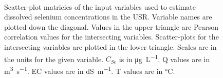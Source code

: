 \begin{landscape}
\begin{figure}
\begin{subfigure}{0.7\textwidth}
		\end{subfigure}\\
		\caption[Scatter-plot matricies of the input variables used to estimate dissolved selenium concentrations in the USR.]{Scatter-plot matricies of the input variables used to estimate dissolved selenium concentrations in the USR.  Variable names are plotted down the diagonal.  Values in the upper triangle are Pearson correlation values for the intersecting variables.  Scatter-plots for the intersecting variables are plotted in the lower triangle.  Scales are in the units for the given variable.  $C_{Se}$ is in \si{\micro\gram\per\liter}.  Q values are in \si{\cubic\meter\per\second}.  EC values are in \si{\deci\siemens\per\meter}.  T values are in \si{\degreeCelsius}.}
		\label{fig:concFullPairs_US}
	\end{figure}
\end{landscape}
\subfiguremid
